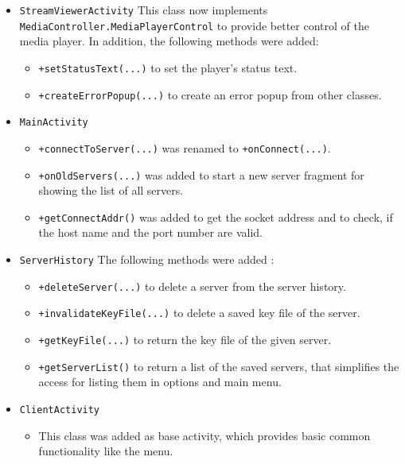 \documentclass[a4paper,10pt]{scrartcl}
\begin{document}
\begin{itemize}
\item \lstinline|StreamViewerActivity| \newline
   This class now implements  \lstinline|MediaController.MediaPlayerControl| to provide better
  control of the media player. In addition, the following methods were added:
  \begin{itemize}
   \item \lstinline|+setStatusText(...)| to set the player's status text.
   \item \lstinline|+createErrorPopup(...)| to create an error popup from other classes.
  \end{itemize}

   \item \lstinline|MainActivity|
  \begin{itemize}
   \item \lstinline|+connectToServer(...)| was renamed to \lstinline|+onConnect(...)|.
   \item \lstinline|+onOldServers(...)| was added to start a new server fragment for showing the
    list of all servers.
    \item \lstinline|+getConnectAddr()| was added to get the socket address
    and to check, if the host name and the port number are valid.
  \end{itemize}

  \item \lstinline|ServerHistory| \newline
  The following methods were added :
  \begin{itemize}
   \item \lstinline|+deleteServer(...)| to delete a server from the server history.
   \item \lstinline|+invalidateKeyFile(...)| to delete a saved key file of the server.
   \item \lstinline|+getKeyFile(...)| to return the key file of the given server.
   \item \lstinline|+getServerList()| to return a list of the saved servers, that simplifies the access for listing them in options and main menu.
  \end{itemize}

 \item \lstinline|ClientActivity|
  \begin{itemize}
   \item This class was added as base activity, which provides basic common functionality like the menu.
  \end{itemize}


\end{itemize}
\end{document}
